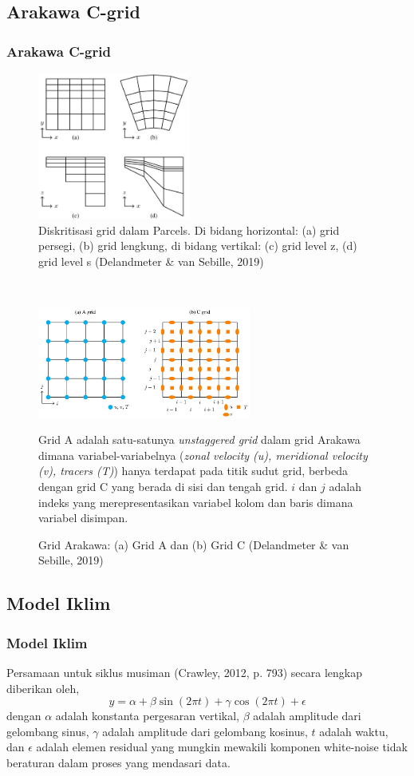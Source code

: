\documentclass{beamer}
\begin{document}
\subsection{Arakawa C-grid}
\begin{frame}[allowframebreaks]
	\frametitle{Arakawa C-grid}	

	\begin{figure}[H]
	\centering
	\includegraphics[width=5cm]{grid.jpg}
	\caption{Diskritisasi grid dalam Parcels. Di bidang horizontal: (a) grid persegi, (b) grid lengkung, di bidang vertikal: (c) grid level z, (d) grid level s (Delandmeter \& van Sebille, 2019)}
	\label{fig:grid}
	\end{figure}
	$\;$ \\
	\begin{figure}[H]
		\centering
		\includegraphics[width=7cm]{arakawa.jpg}
		\caption{Grid Arakawa: (a) Grid A dan (b) Grid C (Delandmeter \& van Sebille, 2019)}
			\label{fig:arakawa}
			\tiny
			Grid A adalah satu-satunya \textit{unstaggered grid} dalam grid Arakawa dimana variabel-variabelnya (\textit{zonal velocity (u), meridional velocity (v), tracers (T)}) hanya terdapat pada titik sudut grid, berbeda dengan grid C yang berada di sisi dan tengah grid. $i$ dan $j$ adalah indeks yang merepresentasikan variabel kolom dan baris dimana variabel disimpan.
	\end{figure}	
\end{frame}

\subsection{Model Iklim}
\begin{frame}[allowframebreaks]
	\frametitle{Model Iklim}
	Persamaan untuk siklus musiman (Crawley, 2012, p. 793) secara lengkap diberikan oleh,
	\begin{equation}\label{eq:sm}
		y = \alpha + \beta \sin(2\pi t)+\gamma \cos(2\pi t) + \epsilon
	\end{equation}
	dengan $\alpha$ adalah konstanta pergesaran vertikal, $\beta$ adalah amplitude dari gelombang sinus, $\gamma$ adalah amplitude dari gelombang kosinus, $t$ adalah waktu, dan $\epsilon$ adalah elemen residual yang mungkin mewakili komponen white-noise tidak beraturan dalam proses yang mendasari data.	
\end{frame}
\end{document}
